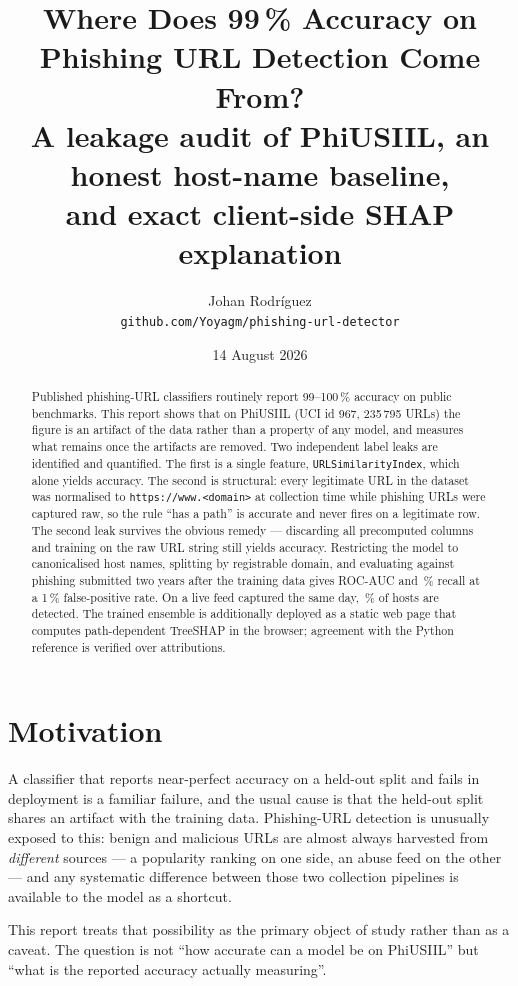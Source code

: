 \documentclass[11pt,a4paper]{article}
\title{\textbf{Where Does 99\,\% Accuracy on Phishing URL Detection Come From?}\\[0.3em]
\large A leakage audit of PhiUSIIL, an honest host-name baseline,\\
and exact client-side SHAP explanation}
\author{Johan Rodríguez\\\small\texttt{github.com/Yoyagm/phishing-url-detector}}
\date{14 August 2026}
\begin{document}
\maketitle

\begin{abstract}
\noindent
Published phishing-URL classifiers routinely report 99--100\,\% accuracy on public benchmarks.
This report shows that on PhiUSIIL (UCI id 967, 235\,795 URLs) the figure is an artifact of the
data rather than a property of any model, and measures what remains once the artifacts are removed.
Two independent label leaks are identified and quantified. The first is a single feature,
\texttt{URLSimilarityIndex}, which alone yields \LeakOneAcc{} accuracy. The second is structural:
every legitimate URL in the dataset was normalised to \texttt{https://www.<domain>} at collection
time while phishing URLs were captured raw, so the rule ``has a path'' is \LeakTwoAcc{} accurate and
never fires on a legitimate row. The second leak survives the obvious remedy --- discarding all
precomputed columns and training on the raw URL string still yields \NaiveAcc{} accuracy.
Restricting the model to canonicalised host names, splitting by registrable domain, and evaluating
against phishing submitted two years after the training data gives ROC-AUC \OodAuc{} and
\OodRecall\,\% recall at a 1\,\% false-positive rate. On a live feed captured the same day,
\OpenphishRate\,\% of hosts are detected. The trained ensemble is additionally deployed as a static
web page that computes path-dependent TreeSHAP in the browser; agreement with the Python reference
is verified over \ParityShapN{} attributions.
\end{abstract}

\section{Motivation}

A classifier that reports near-perfect accuracy on a held-out split and fails in deployment is a
familiar failure, and the usual cause is that the held-out split shares an artifact with the
training data. Phishing-URL detection is unusually exposed to this: benign and malicious URLs are
almost always harvested from \emph{different} sources --- a popularity ranking on one side, an abuse
feed on the other --- and any systematic difference between those two collection pipelines is
available to the model as a shortcut.

This report treats that possibility as the primary object of study rather than as a caveat. The
question is not ``how accurate can a model be on PhiUSIIL'' but ``what is the reported accuracy
actually measuring''.
\end{document}
